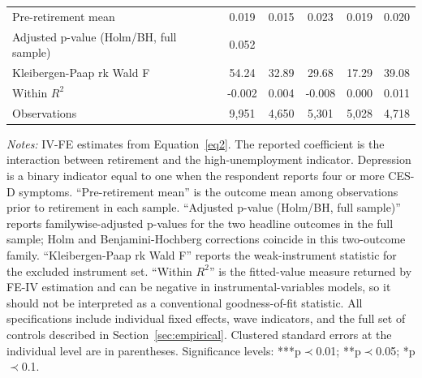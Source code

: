 \documentclass[arguments, manuscript, 11pt]{aastex631}
\begin{document}
\begin{table}[!htbp]
{\begin{tabular}{@{}lccccc@{}}
Pre-retirement mean & 0.019 & 0.015 & 0.023 & 0.019 & 0.020 \\
Adjusted p-value (Holm/BH, full sample) & 0.052 &  &  &  &  \\
Kleibergen-Paap rk Wald F & 54.24 & 32.89 & 29.68 & 17.29 & 39.08 \\
Within $R^2$ & -0.002 & 0.004 & -0.008 & 0.000 & 0.011 \\
Observations & 9,951 & 4,650 & 5,301 & 5,028 & 4,718 \\ \bottomrule
\end{tabular}%
}
\tiny{{\singlespacing \emph{Notes:} IV-FE estimates from Equation~\ref{eq2}. The reported coefficient is the interaction between retirement and the high-unemployment indicator. Depression is a binary indicator equal to one when the respondent reports four or more CES-D symptoms. ``Pre-retirement mean'' is the outcome mean among observations prior to retirement in each sample. ``Adjusted p-value (Holm/BH, full sample)'' reports familywise-adjusted p-values for the two headline outcomes in the full sample; Holm and Benjamini-Hochberg corrections coincide in this two-outcome family. ``Kleibergen-Paap rk Wald F'' reports the weak-instrument statistic for the excluded instrument set. ``Within $R^2$'' is the fitted-value measure returned by FE-IV estimation and can be negative in instrumental-variables models, so it should not be interpreted as a conventional goodness-of-fit statistic. All specifications include individual fixed effects, wave indicators, and the full set of controls described in Section~\ref{sec:empirical}. Clustered standard errors at the individual level are in parentheses. Significance levels: ***p$\prec$0.01; **p$\prec$0.05; *p$\prec$0.1.}}
\end{table}

\FloatBarrier
\end{document}

